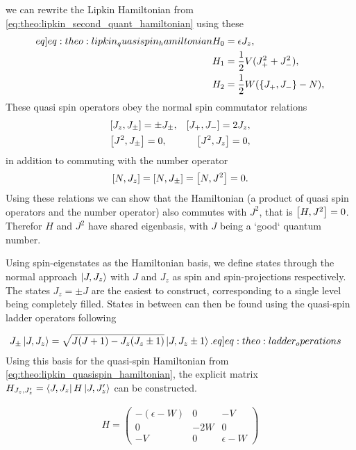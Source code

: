 we can rewrite the Lipkin Hamiltonian from \cref{eq:theo:lipkin_second_quant_hamiltonian} using these
\begin{align}
    \begin{split} \label[eq]{eq:theo:lipkin_quasispin_hamiltonian}
        H_0 &= \epsilon J_z, \\
        H_1 &= \frac{1}{2}V (J_+^2 + J_-^2), \\
        H_2 &= \frac{1}{2}W ( \set{J_+ , J_- } - N ),
    \end{split}
\end{align}
These quasi spin operators obey the normal spin commutator relations
\begin{align*}
    &\commutator{J_z}{J_\pm} = \pm J_\pm, 
    &\commutator{J_+}{J_-} = 2 J_z, \\
    &\commutator{J^2}{J_\pm} = 0,
    &\commutator{J^2}{J_z} = 0,
\end{align*}
in addition to commuting with the number operator
\begin{align*}
    \commutator{N}{J_z} = \commutator{N}{J_\pm} = \commutator{N}{J^2} = 0.
\end{align*}
Using these relations we can show that the Hamiltonian (a product of quasi spin operators and the number operator) also commutes with  $J^2$, that is $\commutator{H}{J^2}=0$. Therefor $H$ and $J^2$ have shared eigenbasis, with $J$ being a `good` quantum number.

Using spin-eigenstates as the Hamiltonian basis, we define states through the normal approach $\ket{J,J_z}$ with $J$ and $ J_z$ as spin and spin-projections respectively. The states $J_z = \pm J$ are the easiest to construct, corresponding to a single level being completely filled. States in between can then be found using the quasi-spin ladder operators following

\begin{align}
    J_\pm \ket{J,J_z} &= \sqrt{J(J+1)-J_z (J_z \pm 1)} \ket{J,J_z \pm 1}. \label[eq]{eq:theo:ladder_operations}
\end{align}
Using this basis for the quasi-spin Hamiltonian from \cref{eq:theo:lipkin_quasispin_hamiltonian}, the explicit matrix $H_{J_z,J'_z} = \bra{J,J_z} H \ket{J,J_z'}$ can be constructed.


\begin{align}
    H = \begin{pmatrix}
        -(\epsilon-W) & 0 & -V \\
        0 & -2W & 0 \\
        -V & 0 & \epsilon - W
    \end{pmatrix}
\end{align}

